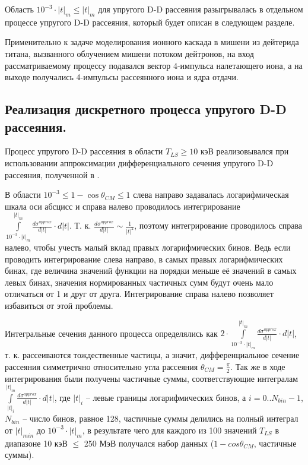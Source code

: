 \documentclass[a4paper,12pt]{article}
\begin{document}
\begin{large}
	Область $10^{-3} \cdot |t|_m \leq |t|_m$ для упругого D-D рассеяния разыгрывалась в отдельном процессе упругого D-D рассеяния, который будет описан в следующем разделе.
	
	Применительно к задаче моделирования ионного каскада в мишени из дейтерида титана, вызванного облучением мишени потоком дейтронов, на вход рассматриваемому процессу подавался вектор 4-импульса налетающего иона, а на выходе получались 4-импульсы рассеянного иона и ядра отдачи.


\subsection{Реализация дискретного процесса упругого D-D рассеяния.}
\label{ElasticDDScatteringRealization}

	Процесс упругого D-D рассеяния в области $T_{LS} \geq 10$ кэВ реализовывался при использовании аппроксимации дифференциального сечения упругого D-D рассеяния, полученной в \cite{70/778-T}.
	
	В области $10^{-3} \leq 1-\cos{\theta_{CM}} \leq 1$ слева направо задавалась логарифмическая шкала оси абсцисс и справа налево проводилось интегрирование $\int \limits^{|t|_m}_{10^{-3}\cdot |t|_m} \frac{d\sigma^{approx}}{d|t|} \cdot d|t|$.
	Т. к. $\frac{d\sigma^{approx}}{d|t|} \sim \frac{1}{|t|^2}$, поэтому интегрирование проводилось справа налево, чтобы учесть малый вклад правых логарифмических бинов.
	Ведь если проводить интегрирование слева направо, в самых правых логарифмических бинах, где величина значений функции на порядки меньше её значений в самых левых бинах, значения нормированных частичных сумм будут очень мало отличаться от 1 и друг от друга.
	Интегрирование справа налево позволяет избавиться от этой проблемы.
	
	Интегральные сечения данного процесса определялись как $2 \cdot \int \limits^{|t|_m}_{10^{-3}\cdot |t|_m} \frac{d\sigma^{approx}}{d|t|} \cdot d|t|$, т. к. рассеиваются тождественные частицы, а значит, дифференциальное сечение рассеяния симметрично относительно угла рассеяния $\theta_{CM}=\frac{\pi}{2}$.
	Так же в ходе интегрирования были получены частичные суммы, соответствующие интегралам $\int \limits^{|t|_m}_{|t|_i} \frac{d\sigma^{approx}}{d|t|} \cdot d|t|$, где $|t|_i$ -- левые границы логарифмических бинов, а $i=0..N_{bin}-1$, $N_{bin}$ -- число бинов, равное 128, частичные суммы делились на полный интеграл от $|t|_{min}$ до $10^{-3} \cdot |t|_m$, в результате чего для каждого из 100 значений $T_{LS}$ в диапазоне 10 кэВ $\leq$ 250 МэВ получался набор данных ($1-cos{\theta_{CM}}$, частичные суммы).
	

\end{large}
\end{document}
